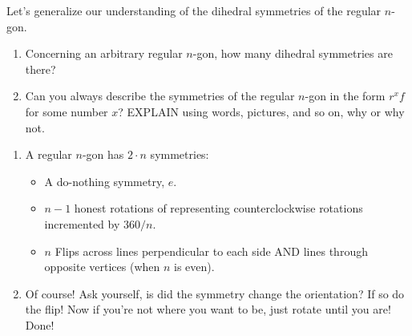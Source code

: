 \documentclass[noauthor,nooutcomes,hints,handout]{ximera}
\begin{document}
\begin{question}
  Let's generalize our understanding of the dihedral symmetries of the
  regular $n$-gon.
  \begin{enumerate}
  \item Concerning an arbitrary regular $n$-gon, how many dihedral symmetries
    are there?
  \item Can you always describe the symmetries of the regular $n$-gon
    in the form $r^xf$ for some number $x$? EXPLAIN using words,
    pictures, and so on, why or why not.
  \end{enumerate}
  \begin{freeResponse}
    \begin{enumerate}
    \item A regular $n$-gon has $2\cdot n$ symmetries:
      \begin{itemize}
      \item A do-nothing symmetry, $e$.
      \item $n-1$ honest rotations of representing counterclockwise rotations incremented by $360/n$.
      \item $n$ Flips across lines perpendicular to each side AND
        lines through opposite vertices (when $n$ is even).
      \end{itemize}
    \item Of course! Ask yourself, is did the symmetry change the
      orientation? If so do the flip! Now if you're not where you
      want to be, just rotate until you are! Done!
    \end{enumerate}
  \end{freeResponse}
\end{question}
\mynewpage
\end{document}
